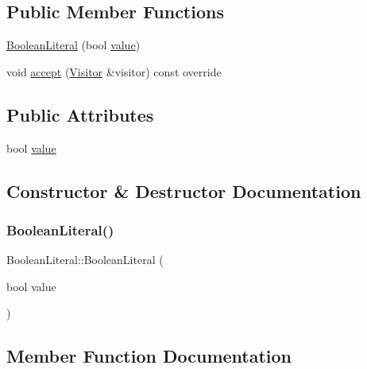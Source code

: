 \subsection*{Public Member Functions}
\begin{DoxyCompactItemize}
\item 
\hyperlink{struct_boolean_literal_ace0fd5afec91d95bb70765a4ea37c10d}{Boolean\+Literal} (bool \hyperlink{struct_boolean_literal_a2d343f4fae4b805fc0260cc86c38d3cc}{value})
\item 
void \hyperlink{struct_boolean_literal_aeb7a30e2b22ac6ad12723da1e72087c5}{accept} (\hyperlink{struct_visitor}{Visitor} \&visitor) const override
\end{DoxyCompactItemize}
\subsection*{Public Attributes}
\begin{DoxyCompactItemize}
\item 
bool \hyperlink{struct_boolean_literal_a2d343f4fae4b805fc0260cc86c38d3cc}{value}
\end{DoxyCompactItemize}


\subsection{Constructor \& Destructor Documentation}
\mbox{\label{struct_boolean_literal_ace0fd5afec91d95bb70765a4ea37c10d}} 
\subsubsection{\texorpdfstring{Boolean\+Literal()}{BooleanLiteral()}}
{\footnotesize\ttfamily Boolean\+Literal\+::\+Boolean\+Literal (\begin{DoxyParamCaption}\item[{bool}]{value }\end{DoxyParamCaption})\hspace{0.3cm}{\ttfamily [inline]}}



\subsection{Member Function Documentation}
\mbox{\label{struct_boolean_literal_aeb7a30e2b22ac6ad12723da1e72087c5}} 
